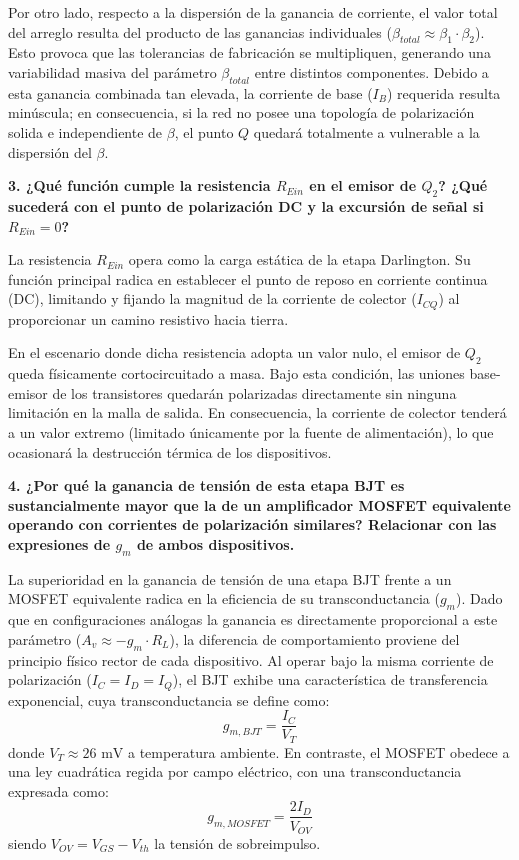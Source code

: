 Por otro lado, respecto a la dispersión de la ganancia de corriente, el valor total del arreglo resulta del producto de las ganancias individuales ($\beta_{total} \approx \beta_1 \cdot \beta_2$). Esto provoca que las tolerancias de fabricación se multipliquen, generando una variabilidad masiva del parámetro $\beta_{total}$ entre distintos componentes. Debido a esta ganancia combinada tan elevada, la corriente de base ($I_B$) requerida resulta minúscula; en consecuencia, si la red no posee una topología de polarización solida e independiente de $\beta$, el punto $Q$ quedará totalmente a vulnerable a la dispersión del $\beta$.


\textbf{3. ¿Qué función cumple la resistencia $R_{Ein}$ en el emisor de $Q_2$? ¿Qué sucederá con el punto de polarización DC y la excursión de señal si $R_{Ein} = 0$?}

La resistencia $R_{Ein}$ opera como la carga estática de la etapa Darlington. Su función principal radica en establecer el punto de reposo en corriente continua (DC), limitando y fijando la magnitud de la corriente de colector ($I_{CQ}$) al proporcionar un camino resistivo hacia tierra.

En el escenario donde dicha resistencia adopta un valor nulo, el emisor de $Q_2$ queda físicamente cortocircuitado a masa. Bajo esta condición, las uniones base-emisor de los transistores quedarán polarizadas directamente sin ninguna limitación en la malla de salida. En consecuencia, la corriente de colector tenderá a un valor extremo (limitado únicamente por la fuente de alimentación), lo que ocasionará la destrucción térmica de los dispositivos.

\textbf{4. ¿Por qué la ganancia de tensión de esta etapa BJT es sustancialmente mayor que la de un amplificador MOSFET equivalente operando con corrientes de polarización similares? Relacionar con las expresiones de $g_m$ de ambos dispositivos.}

La superioridad en la ganancia de tensión de una etapa BJT frente a un MOSFET equivalente radica en la eficiencia de su transconductancia ($g_m$). Dado que en configuraciones análogas la ganancia es directamente proporcional a este parámetro ($A_v \approx -g_m \cdot R_L$), la diferencia de comportamiento proviene del principio físico rector de cada dispositivo. Al operar bajo la misma corriente de polarización ($I_C = I_D = I_Q$), el BJT exhibe una característica de transferencia exponencial, cuya transconductancia se define como:
$$g_{m,BJT} = \frac{I_C}{V_T}$$
donde $V_T \approx 26\text{ mV}$ a temperatura ambiente. En contraste, el MOSFET obedece a una ley cuadrática regida por campo eléctrico, con una transconductancia expresada como:
$$g_{m,MOSFET} = \frac{2I_D}{V_{OV}}$$
siendo $V_{OV} = V_{GS} - V_{th}$ la tensión de sobreimpulso.

